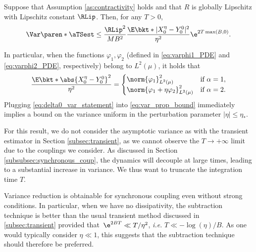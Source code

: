 
\begin{proposition}
	\label{prop:var_ts}
	Suppose that Assumption \ref{as:contractivity} holds and that $R$ is globally Lipschitz with Lipschitz constant $\RLip$. Then, for any $T>0$,
	\begin{equation}
		\Var\paren*{\aTSest} \leq \frac{\RLip^2}{MB^2}\frac{\E\bkt*{|X_0^\eta - Y_0^0|^2}}{\eta^2}\e^{2T\max(B,0)}.
	\label{eq:var_prop_bound}
	\end{equation}
\end{proposition}
%
In particular, when the functions $\varphi_1,\varphi_2$ (defined in \eqref{eq:varphi1_PDE} and \eqref{eq:varphi2_PDE}, respectively) belong to $L^2(\mu)$, it holds that
%
\begin{equation}
	\frac{\E\bkt*{\abs{X_0^\eta - Y_0^0}^2}}{\eta^2} = 
	\begin{cases}
		\norm{\varphi_1}^2_{L^2(\mu)} &\text{if }\alpha = 1, \\
		\norm{\varphi_1 + \eta\varphi_2}^2_{L^2(\mu)} &\text{if }\alpha = 2.
	\end{cases}
	\label{eq:delta0_var_statement}
\end{equation}
%
%
Plugging \eqref{eq:delta0_var_statement} into \eqref{eq:var_prop_bound} immediately implies a bound on the variance uniform in the perturbation parameter $|\eta| \leq \eta_*$.

For this result, we do not consider the asymptotic variance as with the transient estimator in Section \ref{subsec:transient}, as we cannot observe the $T\to+\infty$ limit due to the couplings we consider. As discussed in Section \ref{subsubsec:synchronous_coup}, the dynamics will decouple at large times, leading to a substantial increase in variance. We thus want to truncate the integration time $T$.
%

\begin{remark}
	Variance reduction is obtainable for synchronous coupling even without strong conditions. In particular, when we have no dissipativity, the subtraction technique is better than the usual transient method discussed in \cref{subsec:transient} provided that~$\e^{2BT} \ll T/\eta^2$, \emph{i.e.} $T\ll -\log(\eta)/B$. As one would typically consider $\eta\ll 1$, this suggests that the subtraction technique should therefore be preferred. 
\end{remark}

